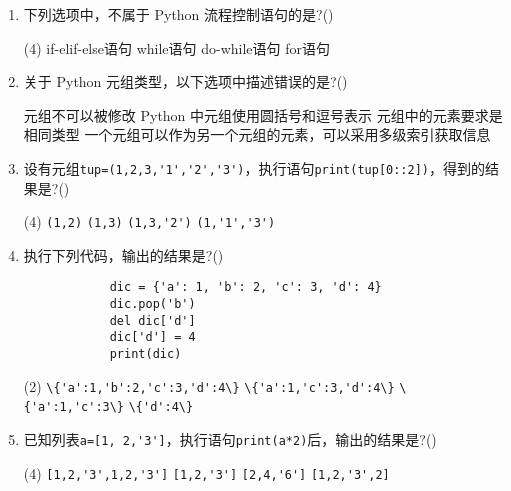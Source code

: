 \documentclass[11pt]{ctexart}
\begin{document}
\begin{enumerate}
        \item 下列选项中，不属于 Python 流程控制语句的是?(\qquad)
        \begin{tasks}(4)
            \task if-elif-else语句
            \task while语句
            \task do-while语句
            \task for语句
        \end{tasks}

        \item 关于 Python 元组类型，以下选项中描述错误的是?(\qquad)
        \begin{tasks}
            \task 元组不可以被修改
            \task Python 中元组使用圆括号和逗号表示
            \task 元组中的元素要求是相同类型
            \task 一个元组可以作为另一个元组的元素，可以采用多级索引获取信息
        \end{tasks}

        \item 设有元组\lstinline!tup=(1,2,3,'1','2','3')!，执行语句\lstinline!print(tup[0::2])!，得到的结果是?(\qquad)
        \begin{tasks}(4)
            \task \lstinline!(1,2)!
            \task \lstinline!(1,3)!
            \task \lstinline!(1,3,'2')!
            \task \lstinline!(1,'1','3')!
        \end{tasks}

        \item  执行下列代码，输出的结果是?(\qquad)
        \begin{lstlisting}
            dic = {'a': 1, 'b': 2, 'c': 3, 'd': 4}
            dic.pop('b')
            del dic['d']
            dic['d'] = 4
            print(dic)
        \end{lstlisting}
        \begin{tasks}(2)
            \task \lstinline!\{'a':1,'b':2,'c':3,'d':4\}!
            \task \lstinline!\{'a':1,'c':3,'d':4\}!
            \task \lstinline!\{'a':1,'c':3\}!
            \task \lstinline!\{'d':4\}!
        \end{tasks}
        
        \item 已知列表\lstinline!a=[1, 2,'3']!，执行语句\lstinline!print(a*2)!后，输出的结果是?(\qquad)
        \begin{tasks}(4)
            \task \lstinline![1,2,'3',1,2,'3']!
            \task \lstinline![1,2,'3']!
            \task \lstinline![2,4,'6']!
            \task \lstinline![1,2,'3',2]!
        \end{tasks}


\end{enumerate}
\end{document}
